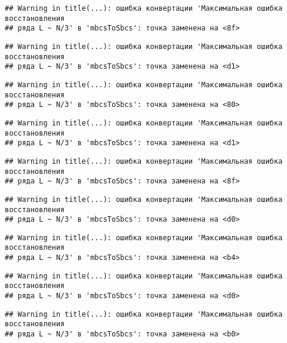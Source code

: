 \documentclass[
]{article}
\begin{document}
\begin{verbatim}
## Warning in title(...): ошибка конвертации 'Максимальная ошибка восстановления
## ряда L ~ N/3' в 'mbcsToSbcs': точка заменена на <8f>
\end{verbatim}

\begin{verbatim}
## Warning in title(...): ошибка конвертации 'Максимальная ошибка восстановления
## ряда L ~ N/3' в 'mbcsToSbcs': точка заменена на <d1>
\end{verbatim}

\begin{verbatim}
## Warning in title(...): ошибка конвертации 'Максимальная ошибка восстановления
## ряда L ~ N/3' в 'mbcsToSbcs': точка заменена на <80>
\end{verbatim}

\begin{verbatim}
## Warning in title(...): ошибка конвертации 'Максимальная ошибка восстановления
## ряда L ~ N/3' в 'mbcsToSbcs': точка заменена на <d1>
\end{verbatim}

\begin{verbatim}
## Warning in title(...): ошибка конвертации 'Максимальная ошибка восстановления
## ряда L ~ N/3' в 'mbcsToSbcs': точка заменена на <8f>
\end{verbatim}

\begin{verbatim}
## Warning in title(...): ошибка конвертации 'Максимальная ошибка восстановления
## ряда L ~ N/3' в 'mbcsToSbcs': точка заменена на <d0>
\end{verbatim}

\begin{verbatim}
## Warning in title(...): ошибка конвертации 'Максимальная ошибка восстановления
## ряда L ~ N/3' в 'mbcsToSbcs': точка заменена на <b4>
\end{verbatim}

\begin{verbatim}
## Warning in title(...): ошибка конвертации 'Максимальная ошибка восстановления
## ряда L ~ N/3' в 'mbcsToSbcs': точка заменена на <d0>
\end{verbatim}

\begin{verbatim}
## Warning in title(...): ошибка конвертации 'Максимальная ошибка восстановления
## ряда L ~ N/3' в 'mbcsToSbcs': точка заменена на <b0>
\end{verbatim}
\end{document}
